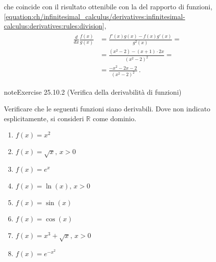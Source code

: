 \documentclass[letterpaper,10pt,italian]{jupyterBook}
\begin{document}
\sphinxAtStartPar
che coincide con il risultato ottenibile con la {\hyperref[\detokenize{ch/infinitesimal_calculus/derivatives:infinitesimal-calculus-derivatives-rules}]{}} del rapporto di funzioni, \eqref{equation:ch/infinitesimal_calculus/derivatives:infinitesimal-calculus:derivatives:rules:division},
\begin{equation*}
\begin{split}\begin{aligned}
  \frac{d}{dx} \frac{f(x)}{g(x)} 
  & = \frac{f'(x) g(x) - f(x) g'(x)}{g^2(x)} = \\
  & = \frac{(x^2-2) - (x+1)\cdot 2 x}{(x^2-2)^2} = \\
  & = \frac{-x^2 - 2x - 2}{(x^2-2)^2} \ .
\end{aligned}\end{split}
\end{equation*} \label{exercise:ch/infinitesimal_calculus/derivatives-problems-exercise-1}

\begin{sphinxadmonition}{note}{Exercise 25.10.2 (Verifica della derivabilità di funzioni)}



\sphinxAtStartPar
Verificare che le seguenti funzioni siano derivabili. Dove non indicato esplicitamente, si consideri \(\mathbb{R}\) come dominio.
\begin{enumerate}
%
\item {} 
\sphinxAtStartPar
\(f(x) = x^2\)

\item {} 
\sphinxAtStartPar
\(f(x) = \sqrt{x}, \, x > 0\)

\item {} 
\sphinxAtStartPar
\(f(x) = e^x\)

\item {} 
\sphinxAtStartPar
\(f(x) = \ln(x), \, x > 0\)

\item {} 
\sphinxAtStartPar
\(f(x) = \sin(x)\)

\item {} 
\sphinxAtStartPar
\(f(x) = \cos(x)\)

\item {} 
\sphinxAtStartPar
\(f(x) = x^3 + \sqrt{x}, \, x > 0\)

\item {} 
\sphinxAtStartPar
\(f(x) = e^{-x^2}\)

\end{enumerate}

\sphinxAtStartPar
{}
\end{sphinxadmonition}
 \label{exercise:ch/infinitesimal_calculus/derivatives-problems-exercise-2}
\end{document}
